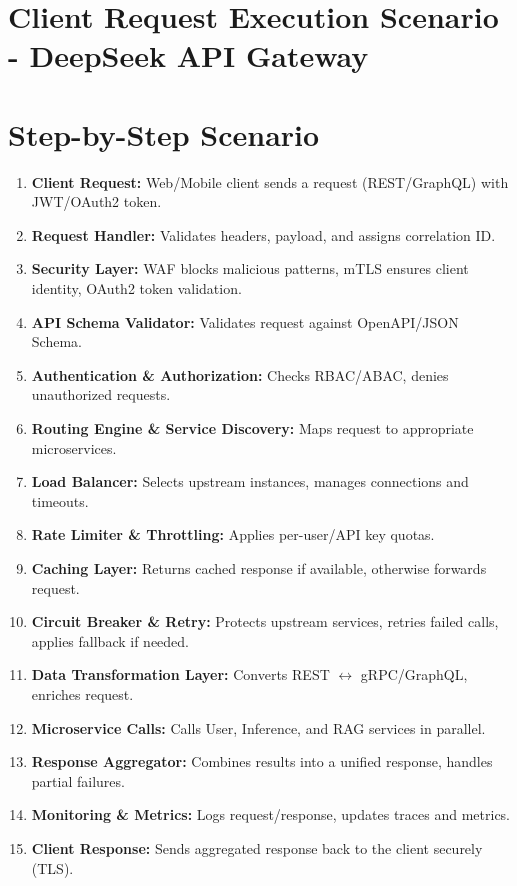 \documentclass[a4paper,11pt]{article}
\begin{document}
\section{\textbf{Client Request Execution Scenario - DeepSeek API Gateway}} 

\vspace{0.5cm}

\section*{Step-by-Step Scenario}

\begin{enumerate}
    \item \textbf{Client Request:} Web/Mobile client sends a request (REST/GraphQL) with JWT/OAuth2 token.
    \item \textbf{Request Handler:} Validates headers, payload, and assigns correlation ID.
    \item \textbf{Security Layer:} WAF blocks malicious patterns, mTLS ensures client identity, OAuth2 token validation.
    \item \textbf{API Schema Validator:} Validates request against OpenAPI/JSON Schema.
    \item \textbf{Authentication \& Authorization:} Checks RBAC/ABAC, denies unauthorized requests.
    \item \textbf{Routing Engine \& Service Discovery:} Maps request to appropriate microservices.
    \item \textbf{Load Balancer:} Selects upstream instances, manages connections and timeouts.
    \item \textbf{Rate Limiter \& Throttling:} Applies per-user/API key quotas.
    \item \textbf{Caching Layer:} Returns cached response if available, otherwise forwards request.
    \item \textbf{Circuit Breaker \& Retry:} Protects upstream services, retries failed calls, applies fallback if needed.
    \item \textbf{Data Transformation Layer:} Converts REST $\leftrightarrow$ gRPC/GraphQL, enriches request.
    \item \textbf{Microservice Calls:} Calls User, Inference, and RAG services in parallel.
    \item \textbf{Response Aggregator:} Combines results into a unified response, handles partial failures.
    \item \textbf{Monitoring \& Metrics:} Logs request/response, updates traces and metrics.
    \item \textbf{Client Response:} Sends aggregated response back to the client securely (TLS).
\end{enumerate}
\end{document}
